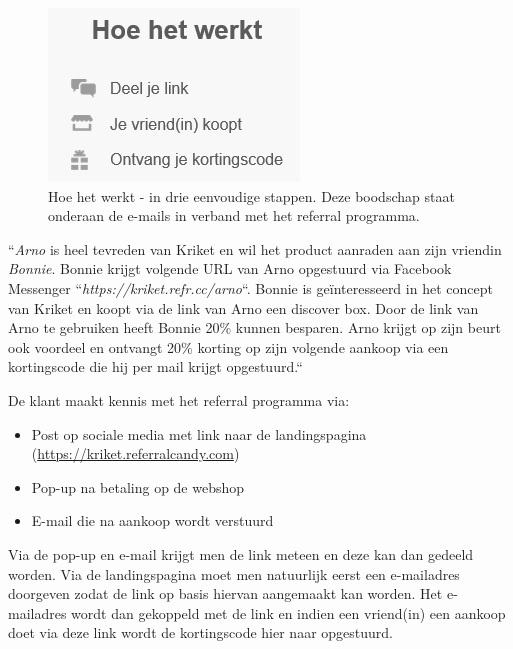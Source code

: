 \begin{figure}[h!]
	\includegraphics[]{img/hoe-het-werkt.png}
	\centering
	\caption{Hoe het werkt - in drie eenvoudige stappen. Deze boodschap staat onderaan de e-mails in verband met het referral programma.}
	\label{fig:hoe-het-werkt}
\end{figure}

``\emph{Arno} is heel tevreden van Kriket en wil het product aanraden aan zijn vriendin \emph{Bonnie}. Bonnie krijgt volgende URL van Arno opgestuurd via Facebook Messenger ``\emph{https://kriket.refr.cc/arno}``. Bonnie is geïnteresseerd in het concept van Kriket en koopt via de link van Arno een discover box. Door de link van Arno te gebruiken heeft Bonnie 20\% kunnen besparen. Arno krijgt op zijn beurt ook voordeel en ontvangt 20\% korting op zijn volgende aankoop via een kortingscode die hij per mail krijgt opgestuurd.``

De klant maakt kennis met het referral programma via:
\begin{itemize}
	\item Post op sociale media met link naar de landingspagina (\href{https://kriket.referralcandy.com}{https://kriket.referralcandy.com})
	\item Pop-up na betaling op de webshop
	\item E-mail die na aankoop wordt verstuurd
\end{itemize}

Via de pop-up en e-mail krijgt men de link meteen en deze kan dan gedeeld worden. Via de landingspagina moet men natuurlijk eerst een e-mailadres doorgeven zodat de link op basis hiervan aangemaakt kan worden. Het e-mailadres wordt dan gekoppeld met de link en indien een vriend(in) een aankoop doet via deze link wordt de kortingscode hier naar opgestuurd. 

